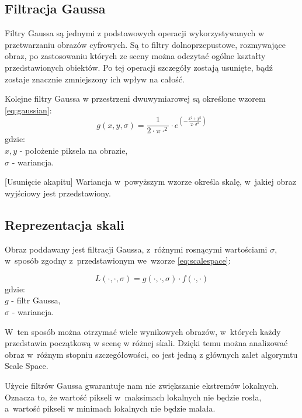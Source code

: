 \subsection{Filtracja Gaussa}
\label{subsec:filtracjaGaussa}
Filtry Gaussa są jednymi z podstawowych operacji wykorzystywanych w przetwarzaniu obrazów cyfrowych. Są to filtry dolnoprzepustowe, rozmywające obraz, po zastosowaniu których ze sceny można odczytać ogólne kształty przedstawionych obiektów. Po tej operacji szczegóły zostają usunięte, bądź zostaje znacznie zmniejszony ich wpływ na całość.

Kolejne filtry Gaussa w przestrzeni dwuwymiarowej są określone wzorem \ref{eq:gaussian}:
\begin{equation}
\label{eq:gaussian}
g(x,y,\sigma)=\frac{1}{2 \cdot \pi \cdot ^ {2} }\cdot e^{(-\frac{x^{2} + y^{2}}{2 \cdot \sigma ^{2}})}
\end{equation}
gdzie:\\
$ x,y $ - położenie piksela na obrazie, \\
$ \sigma $ - wariancja.

[Usunięcie akapitu]
Wariancja w~powyższym wzorze określa skalę, w~jakiej obraz wyjściowy jest przedstawiony. 

\subsection{Reprezentacja skali}
\label{subsec:reprezentacjaskali}
Obraz poddawany jest filtracji Gaussa, z~różnymi rosnącymi wartościami $ \sigma $, w~sposób zgodny z~przedstawionym we~wzorze \ref{eq:scalespace}:

\begin{equation}
\label{eq:scalespace}
L(\cdot,\cdot,\sigma) = g(\cdot,\cdot,\sigma)\cdot f(\cdot,\cdot)
\end{equation}
gdzie:\\
$ g $ - filtr Gaussa, \\
$ \sigma $ - wariancja.

W~ten sposób można otrzymać wiele wynikowych obrazów, w~których każdy przedstawia początkową w scenę w różnej skali. Dzięki temu można analizować obraz w~różnym stopniu szczegółowości, co jest jedną z głównych zalet algorymtu Scale Space.

Użycie filtrów Gaussa gwarantuje nam nie zwiększanie ekstremów lokalnych. Oznacza to, że wartość pikseli w~maksimach lokalnych nie będzie rosła, a~wartość pikseli w minimach lokalnych nie będzie malała.


